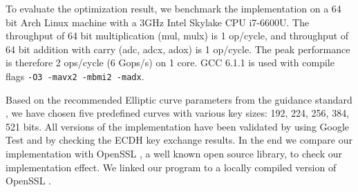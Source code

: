 To evaluate the optimization result, we benchmark the implementation on a 64 bit Arch Linux machine with a 3GHz Intel Skylake CPU i7-6600U. The throughput of 64 bit multiplication (mul, mulx) is 1 op/cycle, and throughput of 64 bit addition with carry (adc, adcx, adox) is 1 op/cycle. The peak performance is therefore 2 ops/cycle (6 Gops/s) on 1 core. GCC 6.1.1 is used with compile flags \texttt{-O3 -mavx2 -mbmi2 -madx}. 

Based on the recommended Elliptic curve parameters from the guidance standard \cite{Brown:2010}, we have chosen five predefined curves with various key sizes: 192, 224, 256, 384, 521 bits. All versions of the implementation have been validated by using Google Test and by checking the ECDH key exchange results. In the end we compare our implementation with OpenSSL \cite{openssl}, a well known open source library, to check our implementation effect. We linked our program to a locally compiled version of OpenSSL . 

